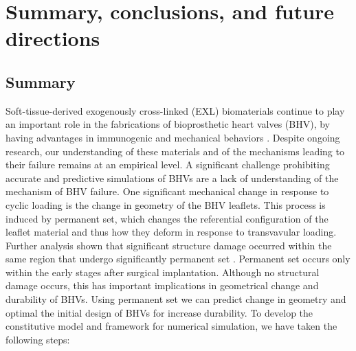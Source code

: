 \chapter{Summary, conclusions, and future directions}

\section{Summary}
    
    Soft-tissue-derived exogenously cross-linked (EXL) biomaterials continue to play an important role in the fabrications of  bioprosthetic heart valves (BHV), by having advantages in immunogenic and mechanical behaviors \cite{starr_artificial_2007}. Despite ongoing research, our understanding of these materials and of the mechanisms leading to their failure remains at an empirical level. A significant challenge prohibiting accurate and predictive simulations of BHVs are a lack of understanding of the mechanism of BHV failure. One significant mechanical change in response to cyclic loading is the change in geometry of the BHV leaflets. This process is induced by permanent set, which changes the referential configuration of the leaflet material and thus how they deform in response to transvavular loading. Further analysis shown that significant structure damage occurred within the same region that undergo significantly permanent set \cite{smith_fatigue_1999}. Permanent set occurs only within the early stages after surgical implantation. Although no structural damage occurs, this has important implications in geometrical change and durability of BHVs. Using permanent set we can predict change in geometry and optimal the initial design of BHVs for increase durability. To develop the constitutive model and framework for numerical simulation, we have taken the following steps:
    
